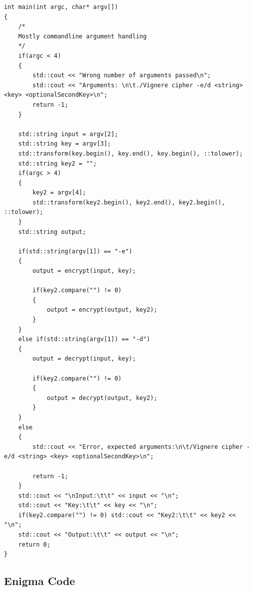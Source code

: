 \documentclass{article}
\begin{document}
\begin{lstlisting}
int main(int argc, char* argv[]) 
{
	/*
	Mostly commandline argument handling
	*/
	if(argc < 4)
	{
		std::cout << "Wrong number of arguments passed\n";
		std::cout << "Arguments: \n\t./Vignere cipher -e/d <string> <key> <optionalSecondKey>\n";
		return -1;
	}

	std::string input = argv[2];
	std::string key = argv[3];
	std::transform(key.begin(), key.end(), key.begin(), ::tolower);
	std::string key2 = "";
	if(argc > 4)
	{	
		key2 = argv[4];
		std::transform(key2.begin(), key2.end(), key2.begin(), ::tolower);
	}
	std::string output;

	if(std::string(argv[1]) == "-e")
	{
		output = encrypt(input, key);

		if(key2.compare("") != 0)
		{
			output = encrypt(output, key2); 
		}
	}
	else if(std::string(argv[1]) == "-d")
	{
		output = decrypt(input, key);

		if(key2.compare("") != 0)
		{
			output = decrypt(output, key2);
		}
	}
	else
	{
		std::cout << "Error, expected arguments:\n\t/Vignere cipher -e/d <string> <key> <optionalSecondKey>\n";

		return -1;
	}
	std::cout << "\nInput:\t\t" << input << "\n";
	std::cout << "Key:\t\t" << key << "\n";
	if(key2.compare("") != 0) std::cout << "Key2:\t\t" << key2 << "\n";
	std::cout << "Output:\t\t" << output << "\n"; 
	return 0;
}
\end{lstlisting}

\subsection{Enigma Code}
\end{document}

